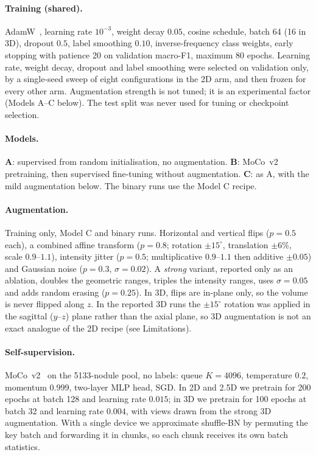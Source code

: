 \documentclass[11pt]{article}
\begin{document}
\paragraph{Training (shared).} AdamW~\citep{loshchilov2019adamw}, learning rate
$10^{-3}$, weight decay $0.05$, cosine schedule, batch 64 (16 in 3D), dropout
$0.5$, label smoothing $0.10$, inverse-frequency class weights, early stopping
with patience 20 on validation macro-F1, maximum 80 epochs. Learning rate,
weight decay, dropout and label smoothing were selected on validation only, by
a single-seed sweep of eight configurations in the 2D arm, and then frozen for
every other arm. Augmentation strength is not tuned; it is an experimental
factor (Models A--C below). The test split was never used for tuning or
checkpoint selection.

\paragraph{Models.} \textbf{A}: supervised from random initialisation, no
augmentation. \textbf{B}: MoCo~v2 pretraining, then supervised fine-tuning
without augmentation. \textbf{C}: as A, with the mild augmentation below. The
binary runs use the Model C recipe.

\paragraph{Augmentation.} Training only, Model C and binary runs. Horizontal
and vertical flips ($p=0.5$ each), a combined affine transform ($p=0.8$;
rotation $\pm15^\circ$, translation $\pm6\%$, scale $0.9$--$1.1$), intensity
jitter ($p=0.5$; multiplicative $0.9$--$1.1$ then additive $\pm0.05$) and
Gaussian noise ($p=0.3$, $\sigma=0.02$). A \emph{strong} variant, reported
only as an ablation, doubles the geometric ranges, triples the intensity
ranges, uses $\sigma=0.05$ and adds random erasing ($p=0.25$). In 3D, flips are
in-plane only, so the volume is never flipped along $z$. In the reported 3D runs
the $\pm15^\circ$ rotation was applied in the sagittal ($y$--$z$) plane rather
than the axial plane, so 3D augmentation is not an exact analogue of the 2D
recipe (see Limitations).

\paragraph{Self-supervision.} MoCo~v2~\citep{he2020moco,chen2020mocov2} on the
5133-nodule pool, no labels: queue $K=4096$, temperature $0.2$, momentum
$0.999$, two-layer MLP head, SGD. In 2D and 2.5D we pretrain for 200 epochs
at batch 128 and learning rate $0.015$; in 3D we pretrain for 100 epochs at
batch 32 and learning rate $0.004$, with views drawn from the strong 3D
augmentation. With a single device we approximate shuffle-BN by permuting the
key batch and forwarding it in chunks, so each chunk receives its own batch
statistics.
\end{document}
